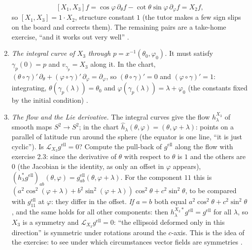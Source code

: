 \begin{paracol}{2}
\begin{enumerate}
        \[
          [X_1,X_3]f=\cos\varphi\,\partial_\theta f-\cot\theta\sin\varphi\,\partial_\varphi f=X_2f,
        \]
        so $[X_1,X_3]=1\cdot X_2$, structure constant $1$ (the tutor makes a few sign slips on the board and corrects them). The remaining pairs are a take-home exercise, ``and it works out very well'' .
  \item \emph{The integral curve of $X_3$ through $p=x^{-1}(\theta_0,\varphi_0)$.} It must satisfy $\gamma_p(0)=p$ and $v_{\gamma_p}=X_3$ along it. In the chart, $(\theta\circ\gamma)'\,\partial_\theta+(\varphi\circ\gamma)'\,\partial_\varphi=\partial_\varphi$, so $(\theta\circ\gamma)'=0$ and $(\varphi\circ\gamma)'=1$: integrating, $\theta(\gamma_p(\lambda))=\theta_0$ and $\varphi(\gamma_p(\lambda))=\lambda+\varphi_0$ (the constants fixed by the initial condition) .
  \item \emph{The flow and the Lie derivative.} The integral curves give the flow $h^{X_3}_\lambda$ of smooth maps $S^2\to S^2$; in the chart $\hat h_\lambda(\theta,\varphi)=(\theta,\varphi+\lambda)$: points on a parallel of latitude run around the sphere (the equator is one line, ``it is just cyclic''). Is $\mathcal L_{X_3}g^{\mathrm{ell}}=0$? Compute the pull-back of $g^{\mathrm{ell}}$ along the flow with exercise 2.3: since the derivative of $\theta$ with respect to $\theta$ is $1$ and the others are $0$ (the Jacobian is the identity, as only an offset in $\varphi$ appears), $(h_\lambda^*g^{\mathrm{ell}})_{ab}(\theta,\varphi)=g^{\mathrm{ell}}_{ab}(\theta,\varphi+\lambda)$. For the component $11$ this is $(a^2\cos^2(\varphi+\lambda)+b^2\sin^2(\varphi+\lambda))\cos^2\theta+c^2\sin^2\theta$, to be compared with $g^{\mathrm{ell}}_{11}$ at $\varphi$: they differ in the offset. \emph{If $a=b$} both equal $a^2\cos^2\theta+c^2\sin^2\theta$, and the same holds for all other components: then $h^{X_3*}_\lambda g^{\mathrm{ell}}=g^{\mathrm{ell}}$ for all $\lambda$, so $X_3$ is a symmetry and $\mathcal L_{X_3}g^{\mathrm{ell}}=0$: ``the ellipsoid deformed only in this direction'' is symmetric under rotations around the $c$-axis. This is the idea of the exercise: to see under which circumstances vector fields are symmetries .

\end{enumerate}
\end{paracol}
